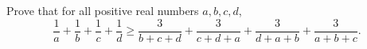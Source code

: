 Prove that for all positive real numbers $a,b,c,d$,
\[\dfrac1a+\dfrac1b+\dfrac1c+\dfrac1d\ge\dfrac{3}{b+c+d}+\dfrac{3}{c+d+a}+\dfrac{3}{d+a+b}+\dfrac{3}{a+b+c}.\]
